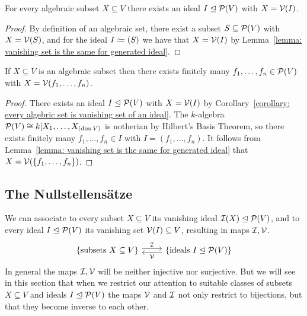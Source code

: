 \begin{corollary}
  \label{corollary: every algebric set is vanishing set of an ideal}
  For every algebraic subset $X \subseteq V$ there exists an ideal $I \trianglelefteq \mathcal{P}(V)$ with $X = \mathcal{V}(I)$.
\end{corollary}


\begin{proof}
  By definition of an algebraic set, there exist a subset $S \subseteq \mathcal{P}(V)$ with $X = \mathcal{V}(S)$, and for the ideal $I \coloneqq (S)$ we have that $X = \mathcal{V}(I)$ by Lemma~\ref{lemma: vanishing set is the same for generated ideal}.
\end{proof}


\begin{corollary}
  If $X \subseteq V$ is an algebraic subset then there exists finitely many $f_1, \dotsc, f_n \in \mathcal{P}(V)$ with $X = \mathcal{V}(f_1, \dotsc, f_n)$.
\end{corollary}


\begin{proof}
  There exists an ideal $I \trianglelefteq \mathcal{P}(V)$ with $X = \mathcal{V}(I)$ by Corollary~\ref{corollary: every algebric set is vanishing set of an ideal}.
  The $k$-algebra $\mathcal{P}(V) \cong k[X_1, \dotsc, X_{(\dim V)}$ is notherian by Hilbert’s Basis Theorem, so there exists finitely many $f_1, \dotsc, f_n \in I$ with $I = (f_1, \dotsc, f_n)$.
  It follows from Lemma~\ref{lemma: vanishing set is the same for generated ideal} that $X = \mathcal{V}(\{f_1, \dotsc, f_n\})$.
\end{proof}





\subsection{The Nullstellensätze}


\begin{fluff}
  We can associate to every subset $X \subseteq V$ its vanishing ideal $\mathcal{I}(X) \trianglelefteq \mathcal{P}(V)$, and to every ideal $I \trianglelefteq \mathcal{P}(V)$ its vanishing set $\mathcal{V}(I) \subseteq V$, resulting in maps $\mathcal{I}, \mathcal{V}$.
  \[
    \begin{tikzcd}
        \{ \text{subsets $X \subseteq V$} \}
        \arrow[shift left]{r}[above]{\mc{I}}
      & \{ \text{ideals $I \idealeq \mc{P}(V)$} \}
        \arrow[shift left]{l}[below]{\mc{V}}
    \end{tikzcd}
  \]
  In general the maps $\mathcal{I}, \mathcal{V}$ will be neither injective nor surjective.
  But we will see in this section that when we restrict our attention to suitable classes of subsets $X \subseteq V$ and ideals $I \trianglelefteq \mathcal{P}(V)$ the maps $\mathcal{V}$ and $\mathcal{I}$ not only restrict to bijections, but that they become inverse to each other.
\end{fluff}


